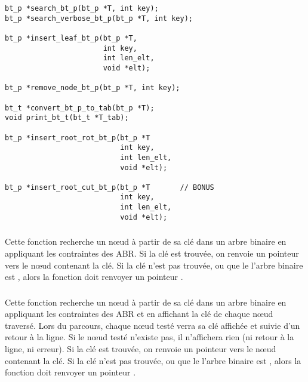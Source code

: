 \lstset{language=C}
\begin{lstlisting}[frame=single]
bt_p *search_bt_p(bt_p *T, int key);
bt_p *search_verbose_bt_p(bt_p *T, int key);

bt_p *insert_leaf_bt_p(bt_p *T,
                       int key,
                       int len_elt,
                       void *elt);

bt_p *remove_node_bt_p(bt_p *T, int key);

bt_t *convert_bt_p_to_tab(bt_p *T);
void print_bt_t(bt_t *T_tab);

bt_p *insert_root_rot_bt_p(bt_p *T
                           int key,
                           int len_elt,
                           void *elt);

bt_p *insert_root_cut_bt_p(bt_p *T       // BONUS
                           int key,
                           int len_elt,
                           void *elt);
\end{lstlisting}


\subsubsection*{}

\noindent Cette fonction recherche un nœud à partir de sa clé dans un arbre binaire en appliquant les contraintes des ABR.
Si la clé est trouvée, on renvoie un pointeur vers le nœud contenant la clé.
Si la clé n'est pas trouvée, ou que le l'arbre binaire est , alors la fonction doit renvoyer un pointeur .

\bigskip


\subsubsection*{}

\noindent Cette fonction recherche un nœud à partir de sa clé dans un arbre binaire en appliquant les contraintes des ABR et en affichant la clé de chaque nœud traversé.
Lors du parcours, chaque nœud testé verra sa clé affichée et suivie d'un retour à la ligne.
Si le nœud testé n'existe pas, il n'affichera rien (ni retour à la ligne, ni erreur).
Si la clé est trouvée, on renvoie un pointeur vers le nœud contenant la clé.
Si la clé n'est pas trouvée, ou que le l'arbre binaire est , alors la fonction doit renvoyer un pointeur .

